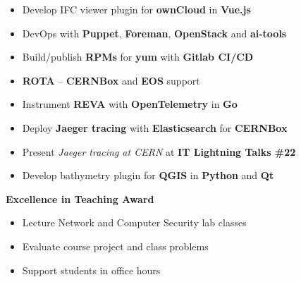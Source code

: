 \documentclass[10pt,a4paper,ragged2e,withhyper]{altacv}
\begin{document}


\makecvheader


\begin{paracol}{2}

\begin{itemize}
\item Develop IFC viewer plugin for \textbf{ownCloud} in \textbf{Vue.js}
\item DevOps with \textbf{Puppet}, \textbf{Foreman}, \textbf{OpenStack} and \textbf{ai-tools}
\item Build/publish \textbf{RPMs} for \textbf{yum} with \textbf{Gitlab CI/CD}
\item \textbf{ROTA} -- \textbf{CERNBox} and \textbf{EOS} support
\item Instrument \textbf{REVA} with \textbf{OpenTelemetry} in \textbf{Go}
\item Deploy \textbf{Jaeger tracing} with \textbf{Elasticsearch} for \textbf{CERNBox}
\item Present \emph{Jaeger tracing at CERN} at \textbf{IT Lightning Talks \#22}
\end{itemize}

\divider

\begin{itemize}
\item Develop bathymetry plugin for \textbf{QGIS} in \textbf{Python} and \textbf{Qt}
\end{itemize}
\divider

\faAward \hspace{0.05cm} \textbf{Excellence in Teaching Award}
\smallskip
\begin{itemize}
\item Lecture Network and Computer Security lab classes
\item Evaluate course project and class problems
\item Support students in office hours
\end{itemize}
\divider


\end{paracol}
\end{document}
